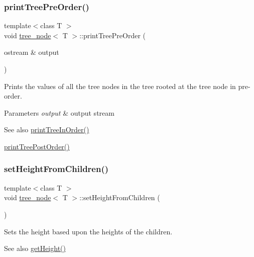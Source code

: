 \subsubsection{\texorpdfstring{print\+Tree\+Pre\+Order()}{printTreePreOrder()}}
{\footnotesize\ttfamily template$<$class T $>$ \\
void \hyperlink{classtree__node}{tree\+\_\+node}$<$ T $>$\+::print\+Tree\+Pre\+Order (\begin{DoxyParamCaption}\item[{ostream \&}]{output }\end{DoxyParamCaption})}

Prints the values of all the tree nodes in the tree rooted at the tree node in pre-\/order. 
\begin{DoxyParams}{Parameters}
{\em output} & output stream \\
\hline
\end{DoxyParams}
\begin{DoxySeeAlso}{See also}
\hyperlink{classtree__node_a06d05cc3d2201be12bbeea10190a923f}{print\+Tree\+In\+Order()} 

\hyperlink{classtree__node_a7a30637fff22c441f95e9e1b7cb34649}{print\+Tree\+Post\+Order()} 
\end{DoxySeeAlso}
\mbox{\label{classtree__node_ab83ce531535bd54bdee8fd3ee9e4c128}} 
\subsubsection{\texorpdfstring{set\+Height\+From\+Children()}{setHeightFromChildren()}}
{\footnotesize\ttfamily template$<$class T $>$ \\
void \hyperlink{classtree__node}{tree\+\_\+node}$<$ T $>$\+::set\+Height\+From\+Children (\begin{DoxyParamCaption}{ }\end{DoxyParamCaption})}

Sets the height based upon the heights of the children. \begin{DoxySeeAlso}{See also}
\hyperlink{classtree__node_a57c8b2000ad0a13b67532b81ba73720b}{get\+Height()} 
\end{DoxySeeAlso}
\mbox{\label{classtree__node_a3db979969a0fe8505ba65c7afabb5463}} 
